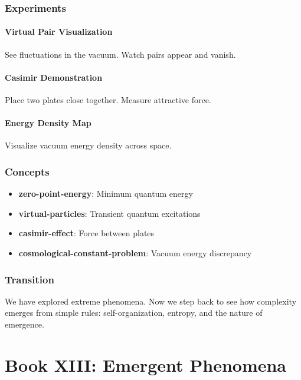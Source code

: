 \documentclass[
  11pt,
  letterpaper,
  twoside,
  openright]{book}
\providecommand{\tightlist}{%
  \setlength{\itemsep}{0pt}\setlength{\parskip}{0pt}}
\begin{document}
\section{Experiments}\label{experiments-36}

\subsection{Virtual Pair
Visualization}\label{virtual-pair-visualization}

See fluctuations in the vacuum. Watch pairs appear and vanish.

\subsection{Casimir Demonstration}\label{casimir-demonstration}

Place two plates close together. Measure attractive force.

\subsection{Energy Density Map}\label{energy-density-map}

Visualize vacuum energy density across space.

\section{Concepts}\label{concepts-35}

\begin{itemize}
\tightlist
\item
  \textbf{zero-point-energy}: Minimum quantum energy
\item
  \textbf{virtual-particles}: Transient quantum excitations
\item
  \textbf{casimir-effect}: Force between plates
\item
  \textbf{cosmological-constant-problem}: Vacuum energy discrepancy
\end{itemize}

\section{Transition}\label{transition-36}

We have explored extreme phenomena. Now we step back to see how
complexity emerges from simple rules: self-organization, entropy, and
the nature of emergence.

\part{Book XIII: Emergent Phenomena}
\end{document}
